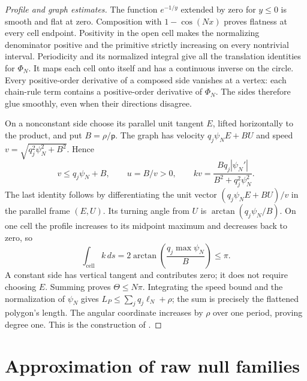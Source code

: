 \begin{proof}[Profile and graph estimates]
The function $e^{-1/y}$ extended by zero for $y\leq0$ is smooth and flat
at zero.  Composition with $1-\cos(Nx)$ proves flatness at every cell
endpoint.  Positivity in the open cell makes the normalizing denominator
positive and the primitive strictly increasing on every nontrivial
interval.  Periodicity and its normalized integral give all the translation
identities for $\Phi_N$.  It maps each cell onto itself and has a continuous
inverse on the circle.  Every positive-order derivative of a composed side
vanishes at a vertex: each chain-rule term contains a positive-order
derivative of $\Phi_N$.  The sides therefore glue smoothly, even when their
directions disagree.

On a nonconstant side choose its parallel unit tangent $E$, lifted
horizontally to the product, and put $B=\rho/\mathsf p$.
The graph has velocity $q_j\psi_NE+BU$ and speed
$v=\sqrt{q_j^2\psi_N^2+B^2}$.  Hence
\[
 v\leq q_j\psi_N+B,\qquad
 u=B/v>0,\qquad
 kv=\frac{Bq_j|\psi_N'|}{B^2+q_j^2\psi_N^2}.
\]
The last identity follows by differentiating the unit vector
$(q_j\psi_NE+BU)/v$ in the parallel frame $(E,U)$.
Its turning angle from $U$ is $\arctan(q_j\psi_N/B)$.
On one cell the profile increases to its midpoint maximum and decreases
back to zero, so
\[
 \int_{\text{cell}}k\,ds
 =2\arctan\left(\frac{q_j\max\psi_N}{B}\right)\leq\pi.
\]
A constant side has vertical tangent and contributes zero; it does not
require choosing $E$.  Summing proves $\Theta\leq N\pi$.
Integrating the speed bound and the normalization of $\psi_N$ gives
$L_P\leq\sum_jq_j\ell_N+\rho$; the sum is precisely the flattened
polygon's length.  The angular coordinate increases by $\rho$ over one
period, proving degree one.  This is the construction of
\cite[Claims 19.19--19.22, pp.~450--453]{MT2007}.
\end{proof}

\section{Approximation of raw null families}
\label{sec:ramps-family-approximation}


